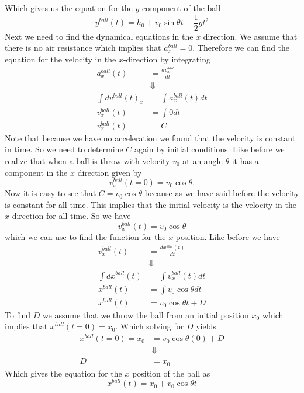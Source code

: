 \documentclass[11pt]{article}
\begin{document}
Which gives us the equation for the $y$-component of the ball
\begin{equation}
y^{ball}(t) = h_0 + v_0\sin\theta t - \frac{1}{2}gt^2
\end{equation}
Next we need to find the dynamical equations in the $x$ direction. We assume that there is 
no air resistance which implies that $a^{ball}_{x} = 0$. Therefore we can find the equation 
for the velocity in the $x$-direction by integrating
\begin{align*}
a^{ball}_x(t) &= \frac{dv^{ball}_x}{dt}\\
&\Downarrow\\
\int dv^{ball}(t)_x &= \int a^{ball}_x(t)dt\\
v^{ball}_x(t) &= \int 0 dt\\
v^{ball}_x(t) &= C
\end{align*}
Note that because we have no acceleration we found that the velocity is constant in time.
So we need to determine $C$ again by initial conditions. Like before we realize that when a
ball is throw with velocity $v_0$ at an angle $\theta$ it has a component in the $x$ 
direction given by
$$v^{ball}_x(t=0) = v_0\cos\theta.$$
Now it is easy to see that $C=v_0\cos\theta$ because as we have said before the velocity is 
constant for all time. This implies that the initial velocity is the velocity in the $x$
direction for all time. So we have
\begin{equation}
v^{ball}_x(t) = v_0\cos\theta
\label{VXBall}
\end{equation}
which we can use to find the function for the $x$ position. Like before we have
\begin{align*}
v^{ball}_x(t) &= \frac{dx^{ball}(t)}{dt}\\
&\Downarrow\\
\int dx^{ball}(t) &= \int v^{ball}_x(t)dt\\
x^{ball}(t) &= \int v_0\cos\theta dt\\
x^{ball}(t) &= v_0\cos\theta t + D
\end{align*}
To find $D$ we assume that we throw the ball from an initial position $x_0$ which implies 
that $x^{ball}(t=0) = x_0$. Which solving for $D$ yields
\begin{align*}
x^{ball}(t=0) = x_0 &= v_0\cos\theta (0) + D\\
&\Downarrow\\
D&=x_0
\end{align*}
Which gives the equation for the $x$ position of the ball as
\begin{equation}
x^{ball}(t) = x_0 + v_0\cos\theta t
\label{XBall}
\end{equation}
\end{document}
